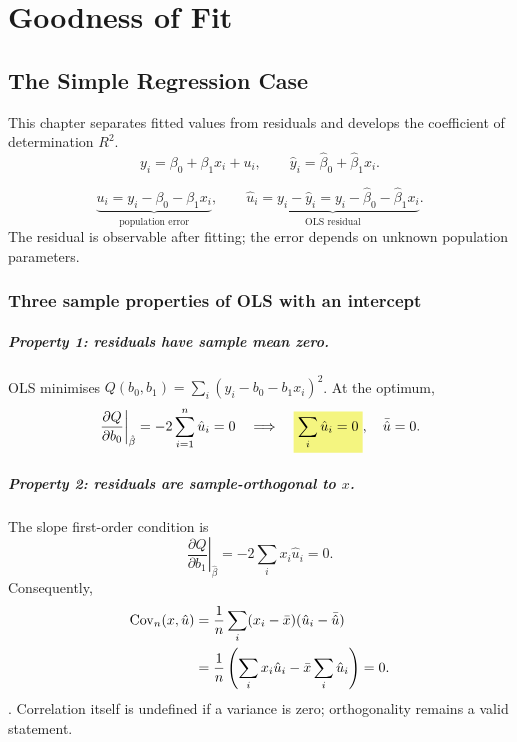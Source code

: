 \chapter{Goodness of Fit}
\label{ch:week3}
\section{The Simple Regression Case}
\label{sec:simple-properties}
This chapter separates fitted values from residuals and develops the coefficient of determination $R^2$.
\[y_i=\beta_0+\beta_1x_i+u_i,\qquad
\hat y_i=\hat\beta_0+\hat\beta_1x_i.\]
\begin{definition}
\[\underbrace{u_i=y_i-\beta_0-\beta_1x_i}_{\text{population error}},\qquad
\underbrace{\hat u_i=y_i-\hat y_i=y_i-\hat\beta_0-\hat\beta_1x_i}_{\text{OLS residual}}.\]
The residual is observable after fitting; the error depends on unknown population parameters.
\end{definition}

\subsection{Three sample properties of OLS with an intercept}
\paragraph{Property 1: residuals have sample mean zero.}
OLS minimises $Q(b_0,b_1)=\sum_i(y_i-b_0-b_1x_i)^2$. At the optimum,
\[\left.\frac{\partial Q}{\partial b_0}\right|_{\hat\beta}
=-2\sum_{i=1}^n\hat u_i=0
\quad\Longrightarrow\quad\hm{\sum_i\hat u_i=0},\quad\bar{\hat u}=0.\]

\paragraph{Property 2: residuals are sample-orthogonal to $x$.}
The slope first-order condition is
\[\left.\frac{\partial Q}{\partial b_1}\right|_{\hat\beta}
=-2\sum_i x_i\hat u_i=0.\]
Consequently,
\begin{align*}
\operatorname{Cov}_n(x,\hat u)
&=\frac1n\sum_i(x_i-\bar x)(\hat u_i-\bar{\hat u})\\
&=\frac1n\left(\sum_i x_i\hat u_i-\bar x\sum_i\hat u_i\right)=0.
\end{align*}
. Correlation itself is undefined if a variance is zero; orthogonality remains a valid statement.

